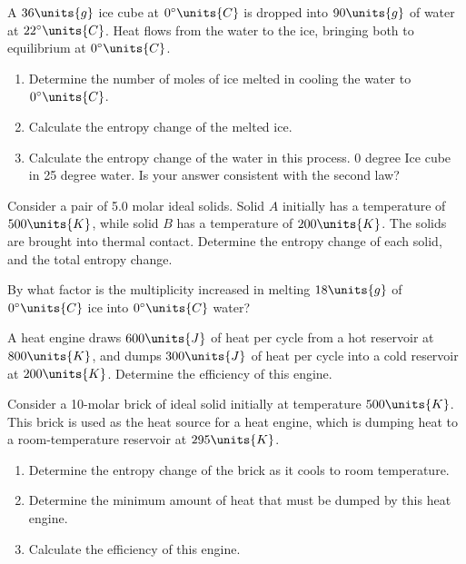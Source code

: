 \begin{problem} 
  A $36\units{g}$ ice cube at $0^\circ\units{C}$ is dropped into
  $90\units{g}$ of water at $22^\circ\units{C}$.  Heat flows from the
  water to the ice, bringing both to equilibrium at
  $0^\circ\units{C}$.
  \begin{enumerate}
  \item Determine the number of moles of ice melted in cooling the
    water to $0^\circ\units{C}$.
  \item Calculate the entropy change of the melted ice.
  \item Calculate the entropy change of the water in this process.  0
    degree Ice cube in 25 degree water.  Is your answer consistent
    with the second law?
  \end{enumerate}
\end{problem}

\begin{problem}
  Consider a pair of 5.0 molar ideal solids.  Solid $A$ initially has
  a temperature of $500\units{K}$, while solid $B$ has a temperature of
  $200\units{K}$.  The solids are brought into thermal contact.
  Determine the entropy change of each solid, and the total entropy
  change. 
\end{problem}

\begin{problem}
  By what factor is the multiplicity increased in melting
  $18\units{g}$ of $0^\circ\units{C}$ ice into $0^\circ\units{C}$ water?
\end{problem}

\begin{problem} 
  A heat engine draws $600\units{J}$ of heat per cycle from a hot
  reservoir at $800\units{K}$, and dumps $300\units{J}$ of heat per
  cycle into a cold reservoir at $200\units{K}$.  Determine the
  efficiency of this engine.
\end{problem}

\begin{problem}
  Consider a 10-molar brick of ideal solid initially at temperature
  $500\units{K}$.  This brick is used as the heat source for a heat
  engine, which is dumping heat to a room-temperature reservoir at
  $295\units{K}$.
  \begin{enumerate}
  \item Determine the entropy change of the brick as it cools to room
    temperature.
  \item Determine the minimum amount of heat that must be dumped by
    this heat engine.
  \item Calculate the efficiency of this engine.
  \end{enumerate}
\end{problem}

